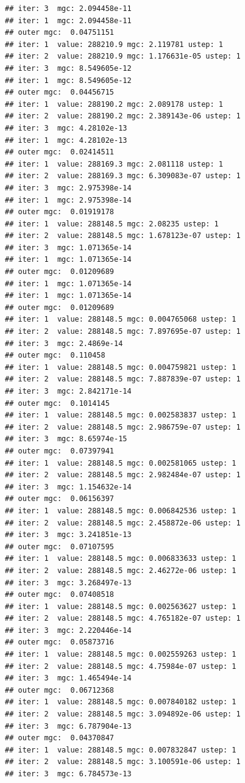 \documentclass{article}\usepackage[]{graphicx}\usepackage[]{xcolor}
\makeatletter
\newenvironment{kframe}{%
 \def\at@end@of@kframe{}%
 \ifinner\ifhmode%
  \def\at@end@of@kframe{\end{minipage}}%
  \begin{minipage}{\columnwidth}%
 \fi\fi%
 \def\FrameCommand##1{\hskip\@totalleftmargin \hskip-\fboxsep
 \colorbox{shadecolor}{##1}\hskip-\fboxsep
     \hskip-\linewidth \hskip-\@totalleftmargin \hskip\columnwidth}%
 \MakeFramed {\advance\hsize-\width
   \@totalleftmargin\z@ \linewidth\hsize
   \@setminipage}}%
 {\par\unskip\endMakeFramed%
 \at@end@of@kframe}
\newenvironment{knitrout}{}{} %
\makeatother
\begin{document}
\begin{knitrout}
\begin{kframe}
\begin{verbatim}
## iter: 3  mgc: 2.094458e-11 
## iter: 1  mgc: 2.094458e-11 
## outer mgc:  0.04751151 
## iter: 1  value: 288210.9 mgc: 2.119781 ustep: 1 
## iter: 2  value: 288210.9 mgc: 1.176631e-05 ustep: 1 
## iter: 3  mgc: 8.549605e-12 
## iter: 1  mgc: 8.549605e-12 
## outer mgc:  0.04456715 
## iter: 1  value: 288190.2 mgc: 2.089178 ustep: 1 
## iter: 2  value: 288190.2 mgc: 2.389143e-06 ustep: 1 
## iter: 3  mgc: 4.28102e-13 
## iter: 1  mgc: 4.28102e-13 
## outer mgc:  0.02414511 
## iter: 1  value: 288169.3 mgc: 2.081118 ustep: 1 
## iter: 2  value: 288169.3 mgc: 6.309083e-07 ustep: 1 
## iter: 3  mgc: 2.975398e-14 
## iter: 1  mgc: 2.975398e-14 
## outer mgc:  0.01919178 
## iter: 1  value: 288148.5 mgc: 2.08235 ustep: 1 
## iter: 2  value: 288148.5 mgc: 1.678123e-07 ustep: 1 
## iter: 3  mgc: 1.071365e-14 
## iter: 1  mgc: 1.071365e-14 
## outer mgc:  0.01209689 
## iter: 1  mgc: 1.071365e-14 
## iter: 1  mgc: 1.071365e-14 
## outer mgc:  0.01209689 
## iter: 1  value: 288148.5 mgc: 0.004765068 ustep: 1 
## iter: 2  value: 288148.5 mgc: 7.897695e-07 ustep: 1 
## iter: 3  mgc: 2.4869e-14 
## outer mgc:  0.110458 
## iter: 1  value: 288148.5 mgc: 0.004759821 ustep: 1 
## iter: 2  value: 288148.5 mgc: 7.887839e-07 ustep: 1 
## iter: 3  mgc: 2.842171e-14 
## outer mgc:  0.1014145 
## iter: 1  value: 288148.5 mgc: 0.002583837 ustep: 1 
## iter: 2  value: 288148.5 mgc: 2.986759e-07 ustep: 1 
## iter: 3  mgc: 8.65974e-15 
## outer mgc:  0.07397941 
## iter: 1  value: 288148.5 mgc: 0.002581065 ustep: 1 
## iter: 2  value: 288148.5 mgc: 2.982484e-07 ustep: 1 
## iter: 3  mgc: 1.154632e-14 
## outer mgc:  0.06156397 
## iter: 1  value: 288148.5 mgc: 0.006842536 ustep: 1 
## iter: 2  value: 288148.5 mgc: 2.458872e-06 ustep: 1 
## iter: 3  mgc: 3.241851e-13 
## outer mgc:  0.07107595 
## iter: 1  value: 288148.5 mgc: 0.006833633 ustep: 1 
## iter: 2  value: 288148.5 mgc: 2.46272e-06 ustep: 1 
## iter: 3  mgc: 3.268497e-13 
## outer mgc:  0.07408518 
## iter: 1  value: 288148.5 mgc: 0.002563627 ustep: 1 
## iter: 2  value: 288148.5 mgc: 4.765182e-07 ustep: 1 
## iter: 3  mgc: 2.220446e-14 
## outer mgc:  0.05873716 
## iter: 1  value: 288148.5 mgc: 0.002559263 ustep: 1 
## iter: 2  value: 288148.5 mgc: 4.75984e-07 ustep: 1 
## iter: 3  mgc: 1.465494e-14 
## outer mgc:  0.06712368 
## iter: 1  value: 288148.5 mgc: 0.007840182 ustep: 1 
## iter: 2  value: 288148.5 mgc: 3.094892e-06 ustep: 1 
## iter: 3  mgc: 6.787904e-13 
## outer mgc:  0.04370847 
## iter: 1  value: 288148.5 mgc: 0.007832847 ustep: 1 
## iter: 2  value: 288148.5 mgc: 3.100591e-06 ustep: 1 
## iter: 3  mgc: 6.784573e-13 

\end{verbatim}
\end{kframe}
\end{knitrout}
\end{document}
